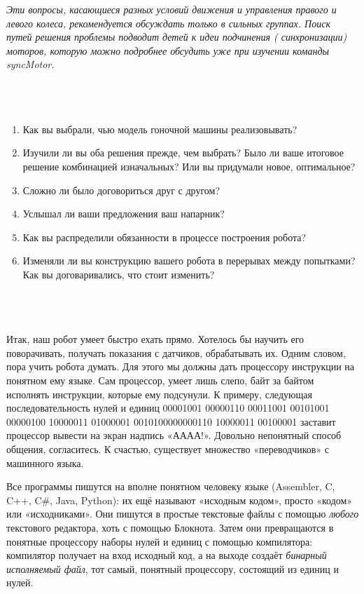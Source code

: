 {\slshape *Эти вопросы, касающиеся разных условий движения и управления правого и левого колеса, рекомендуется обсуждать только в сильных группах. Поиск путей решения проблемы подводит детей к идеи подчинения ( синхронизации) моторов, которую можно подробнее обсудить уже при изучении команды syncMotor.}\\\\

{\hypertarget{lesson9x4}{}}\\\\

\begin{enumerate}
	\item Как вы выбрали, чью модель гоночной машины реализовывать?
	\item Изучили ли вы оба решения прежде, чем выбрать? Было ли ваше итоговое решение комбинацией изначальных? Или вы придумали новое, оптимальное?
	\item Сложно ли было договориться друг с другом?
	\item Услышал ли ваши предложения ваш напарник?
	\item Как вы распределили обязанности в процессе построения робота?
	\item Изменяли ли вы конструкцию вашего робота в перерывах между попытками? Как вы договаривались, что стоит изменить?\\\\
\end{enumerate}

{\hypertarget{lesson9x5}{}}\\\\

Итак, наш робот умеет быстро ехать прямо. Хотелось бы научить его поворачивать, получать показания с датчиков, обрабатывать их. Одним словом, пора учить робота думать. Для этого мы должны дать процессору инструкции на понятном ему языке. Сам процессор, умеет лишь слепо, байт за байтом исполнять инструкции, которые ему подсунули. К примеру, следующая последовательность нулей и единиц 00001001 00000110 00011001  00101001 00000100 10000011 01000001 0010100000000110 10000011 00100001 заставит процессор вывести на экран надпись «АААА!». Довольно непонятный способ общения, согласитесь. К счастью, существует множество «переводчиков» с машинного языка.

Все программы пишутся на вполне понятном человеку языке (Assembler, C, C++, C\#, Java, Python): их ещё называют «исходным кодом», просто «кодом» или «исходниками». Они пишутся в простые текстовые файлы с помощью {\slshape любого} текстового редактора, хоть с помощью Блокнота. Затем они превращаются в понятные процессору наборы нулей и единиц с помощью компилятора: компилятор получает на вход исходный код, а на выходе создаёт {\slshape бинарный исполняемый файл}, тот самый, понятный процессору, состоящий из единиц и нулей.

